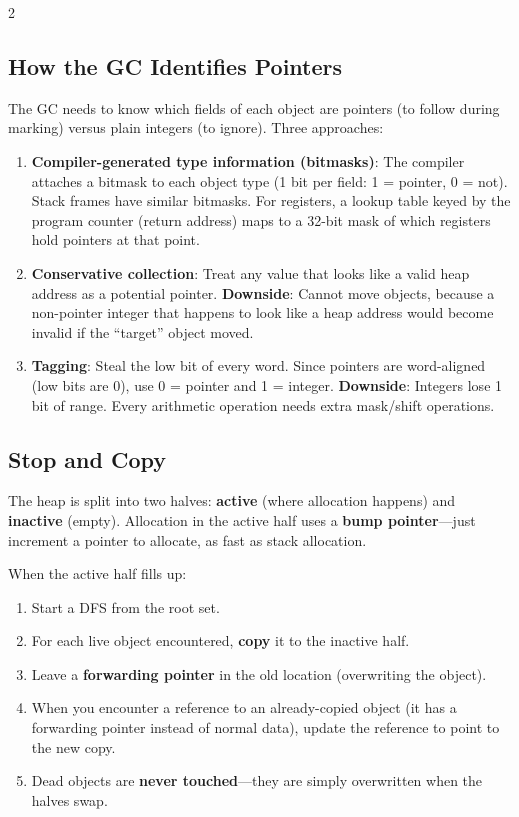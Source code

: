 \documentclass[9pt,landscape]{extarticle}
\begin{document}
\begin{multicols}{2}
\subsection{How the GC Identifies Pointers}

The GC needs to know which fields of each object are pointers (to follow during marking) versus plain integers (to ignore). Three approaches:

\begin{enumerate}
  \item \textbf{Compiler-generated type information (bitmasks)}: The compiler attaches a bitmask to each object type (1 bit per field: 1 = pointer, 0 = not). Stack frames have similar bitmasks. For registers, a lookup table keyed by the program counter (return address) maps to a 32-bit mask of which registers hold pointers at that point.
  \item \textbf{Conservative collection}: Treat any value that looks like a valid heap address as a potential pointer. \textbf{Downside}: Cannot move objects, because a non-pointer integer that happens to look like a heap address would become invalid if the ``target'' object moved.
  \item \textbf{Tagging}: Steal the low bit of every word. Since pointers are word-aligned (low bits are 0), use 0 = pointer and 1 = integer. \textbf{Downside}: Integers lose 1 bit of range. Every arithmetic operation needs extra mask/shift operations.
\end{enumerate}

\subsection{Stop and Copy}

\begin{exambox}
The heap is split into two halves: \textbf{active} (where allocation happens) and \textbf{inactive} (empty). Allocation in the active half uses a \textbf{bump pointer}---just increment a pointer to allocate, as fast as stack allocation.

When the active half fills up:
\begin{enumerate}
  \item Start a DFS from the root set.
  \item For each live object encountered, \textbf{copy} it to the inactive half.
  \item Leave a \textbf{forwarding pointer} in the old location (overwriting the object).
  \item When you encounter a reference to an already-copied object (it has a forwarding pointer instead of normal data), update the reference to point to the new copy.
  \item Dead objects are \textbf{never touched}---they are simply overwritten when the halves swap.
\end{enumerate}


\end{exambox}
\end{multicols}
\end{document}
